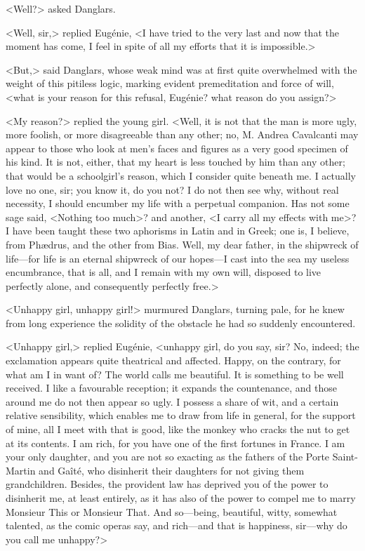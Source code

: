  <Well?> asked Danglars. 

 <Well, sir,> replied Eugénie, <I have tried to the very last and now that the moment has come, I feel in spite of all my efforts that it is impossible.> 

 <But,> said Danglars, whose weak mind was at first quite overwhelmed with the weight of this pitiless logic, marking evident premeditation and force of will, <what is your reason for this refusal, Eugénie? what reason do you assign?> 

 <My reason?> replied the young girl. <Well, it is not that the man is more ugly, more foolish, or more disagreeable than any other; no, M. Andrea Cavalcanti may appear to those who look at men's faces and figures as a very good specimen of his kind. It is not, either, that my heart is less touched by him than any other; that would be a schoolgirl's reason, which I consider quite beneath me. I actually love no one, sir; you know it, do you not? I do not then see why, without real necessity, I should encumber my life with a perpetual companion. Has not some sage said, <Nothing too much>? and another, <I carry all my effects with me>? I have been taught these two aphorisms in Latin and in Greek; one is, I believe, from Phædrus, and the other from Bias. Well, my dear father, in the shipwreck of life—for life is an eternal shipwreck of our hopes—I cast into the sea my useless encumbrance, that is all, and I remain with my own will, disposed to live perfectly alone, and consequently perfectly free.> 

 <Unhappy girl, unhappy girl!> murmured Danglars, turning pale, for he knew from long experience the solidity of the obstacle he had so suddenly encountered. 

 <Unhappy girl,> replied Eugénie, <unhappy girl, do you say, sir? No, indeed; the exclamation appears quite theatrical and affected. Happy, on the contrary, for what am I in want of? The world calls me beautiful. It is something to be well received. I like a favourable reception; it expands the countenance, and those around me do not then appear so ugly. I possess a share of wit, and a certain relative sensibility, which enables me to draw from life in general, for the support of mine, all I meet with that is good, like the monkey who cracks the nut to get at its contents. I am rich, for you have one of the first fortunes in France. I am your only daughter, and you are not so exacting as the fathers of the Porte Saint-Martin and Gaîté, who disinherit their daughters for not giving them grandchildren. Besides, the provident law has deprived you of the power to disinherit me, at least entirely, as it has also of the power to compel me to marry Monsieur This or Monsieur That. And so—being, beautiful, witty, somewhat talented, as the comic operas say, and rich—and that is happiness, sir—why do you call me unhappy?> 

